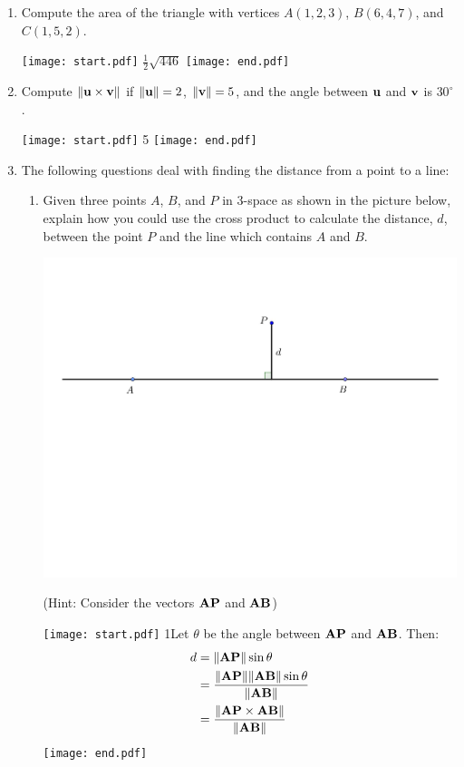 \documentclass[12pt]{article}
\begin{document}
\begin{enumerate}
\item Compute the area of the triangle with vertices $A(1,2,3)$, $B(6,4,7)$, and $C(1,5,2)$.

\texttt{[image: start.pdf]}
{{$\frac{1}{2}\sqrt{446}$}}
\texttt{[image: end.pdf]}


\item Compute $\|{\bf u} \times {\bf v}\|$ if $\|{\bf u}\|=2$, $\|{\bf v}\|=5$, and the angle between ${\bf u}$ and ${\bf v}$ is $30^{\circ}$.

\texttt{[image: start.pdf]}
{{5}}
\texttt{[image: end.pdf]}


\item The following questions deal with finding the distance from a point to a line:

\begin{enumerate}

\item Given three points $A$, $B$, and $P$ in 3-space as shown in the picture below, explain how you could use the cross product to calculate the distance, $d$, between the point $P$ and the line which contains $A$ and $B$.  

\begin{center}
\includegraphics[scale=0.5]{length.pdf}
\end{center}

(Hint: Consider the vectors ${\bf AP}$ and ${\bf AB}$)

\texttt{[image: start.pdf]}
{{{1\linewidth}{Let $\theta$ be the angle between ${\bf AP}$ and ${\bf AB}$.  Then:
\begin{align*}
d&=\|{\bf AP}\|\sin{\theta}\\
&=\frac{\|{\bf AP}\|\|{\bf AB}\|\sin{\theta}}{\|{\bf AB}\|}\\
&=\frac{\|{\bf AP}\times{\bf AB}\|}{\|{\bf AB}\|}
\end{align*}
}}}
\texttt{[image: end.pdf]}



\end{enumerate}
\end{enumerate}
\end{document}
